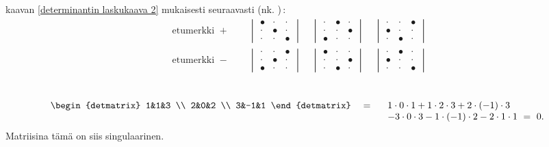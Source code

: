 kaavan \eqref{determinantin laskukaava 2} mukaisesti seuraavasti
%
(nk. )\,:
\[
\begin{aligned}
\text{etumerkki } + \qquad
\begin{vmatrix}
\bullet & \cdot & \cdot \\ 
\cdot & \bullet & \cdot \\
\cdot & \cdot & \bullet
\end{vmatrix} \quad
\begin{vmatrix}
\cdot & \bullet & \cdot \\ 
\cdot & \cdot & \bullet \\
\bullet & \cdot & \cdot
\end{vmatrix} \quad
\begin{vmatrix}
\cdot & \cdot & \bullet \\ 
\bullet & \cdot & \cdot  \\
\cdot & \bullet & \cdot
\end{vmatrix} \\[5mm]
\text{etumerkki } - \qquad
\begin{vmatrix}
\cdot & \cdot & \bullet \\ 
\cdot & \bullet & \cdot \\
\bullet & \cdot & \cdot
\end{vmatrix} \quad
\begin{vmatrix}
\bullet & \cdot & \cdot \\ 
\cdot & \cdot & \bullet \\
\cdot & \bullet & \cdot
\end{vmatrix} \quad
\begin{vmatrix}
\cdot & \bullet & \cdot \\ 
\bullet & \cdot & \cdot  \\
\cdot & \cdot & \bullet
\end{vmatrix} \\
\end{aligned}
\]
\begin{Exa}
\[
\begin{detmatrix} 1&1&3 \\ 2&0&2 \\ 3&-1&1 \end{detmatrix} \quad = 
         \quad \begin{array}{l} 
               \\ 1\cdot 0\cdot 1+1\cdot 2\cdot 3+2\cdot (-1)\cdot 3 \\
                  -3\cdot 0\cdot 3-1\cdot (-1)\cdot 2-2\cdot  1\cdot 1 \ =\ 0. 
               \end{array}
\]
Matriisina tämä on siis singulaarinen. \loppu
\end{Exa}
